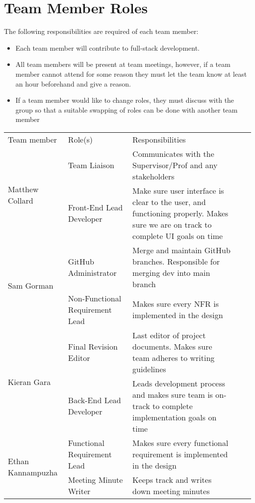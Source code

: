\documentclass{article}
\begin{document}
\section{Team Member Roles}
The following responsibilities are required of each team member:
\begin{itemize}
    \item Each team member will contribute to full-stack development.
    \item All team members will be present at team meetings, however, if a team member cannot attend for some reason they must let the team know at least an hour beforehand and give a reason.
    \item If a team member would like to change roles, they must discuss with the group so that a suitable swapping of roles can be done with another team member
\end{itemize}

\begin{table}[h]
\centering
\begin{tabular}{|p{1.3in}|p{2in}|p{2.6in}|ll}
\cline{1-3}
Team member& Role(s)& Responsibilities &  &  \\ \cline{1-3}
\multirow{2}{*}{Matthew Collard}   & Team Liaison & Communicates with the Supervisor/Prof and any stakeholders &  &  \\ \cline{2-3} & Front-End Lead Developer & Make sure user interface is clear to the user, and functioning properly. Makes sure we are on track to complete UI goals on time &  &  \\ \cline{1-3}
\multirow{2}{*}{Sam Gorman} & GitHub Administrator & Merge and maintain GitHub branches. Responsible for merging dev into main branch  &  &  \\ \cline{2-3} & Non-Functional Requirement Lead & Makes sure every NFR is implemented in the design &  &  \\ \cline{1-3}
\multirow{2}{*}{Kieran Gara}  & Final Revision Editor  & Last editor of project documents. Makes sure team adheres to writing guidelines   &  &  \\ \cline{2-3}& Back-End Lead Developer  & Leads development process and makes sure team is on-track to complete implementation goals on time  &  &  \\ \cline{1-3}
\multirow{2}{*}{Ethan Kannampuzha} & Functional Requirement Lead     & Makes sure every functional requirement is implemented in the design &  &  \\ \cline{2-3} & Meeting Minute Writer & Keeps track and writes down meeting minutes &  &  \\ \cline{1-3}
\end{tabular}
\end{table}
\end{document}
